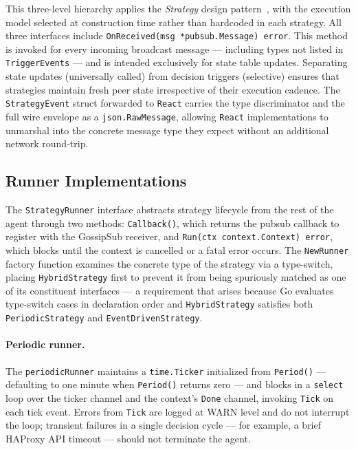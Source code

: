 This three-level hierarchy applies the \emph{Strategy} design pattern~\cite{gamma1994patterns},
with the execution model selected at construction time rather than hardcoded in
each strategy.
All three interfaces include \texttt{OnReceived(msg~*pubsub.Message)~error}.
This method is invoked for every incoming broadcast message — including types
not listed in \texttt{TriggerEvents} — and is intended exclusively for state
table updates.
Separating state updates (universally called) from decision triggers (selective)
ensures that strategies maintain fresh peer state irrespective of their execution
cadence.
The \texttt{StrategyEvent} struct forwarded to \texttt{React} carries the type
discriminator and the full wire envelope as a \texttt{json.RawMessage}, allowing
\texttt{React} implementations to unmarshal into the concrete message type they
expect without an additional network round-trip.

\subsection{Runner Implementations}
\label{subsec:runners}

The \texttt{StrategyRunner} interface abstracts strategy lifecycle from the rest
of the agent through two methods: \texttt{Callback()}, which returns the pubsub
callback to register with the \ac{GossipSub} receiver, and
\texttt{Run(ctx~context.Context)~error}, which blocks until the context is
cancelled or a fatal error occurs.
The \texttt{NewRunner} factory function examines the concrete type of the
strategy via a type-switch, placing \texttt{HybridStrategy} first to prevent it
from being spuriously matched as one of its constituent interfaces — a
requirement that arises because Go evaluates type-switch cases in declaration
order and \texttt{HybridStrategy} satisfies both \texttt{PeriodicStrategy} and
\texttt{EventDrivenStrategy}.

\paragraph{Periodic runner.}
The \texttt{periodicRunner} maintains a \texttt{time.Ticker} initialized from
\texttt{Period()} — defaulting to one minute when \texttt{Period()} returns zero
— and blocks in a \texttt{select} loop over the ticker channel and the context's
\texttt{Done} channel, invoking \texttt{Tick} on each tick event.
Errors from \texttt{Tick} are logged at WARN level and do not interrupt the
loop; transient failures in a single decision cycle — for example, a brief
\ac{HAProxy} \ac{API} timeout — should not terminate the agent.

